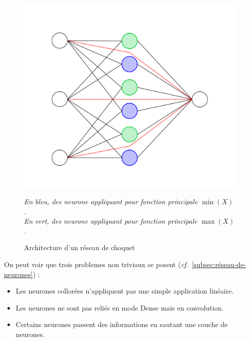 \begin{figure}[H]
    \center
    \includegraphics[height=\moyen]{pict/chnet1}
	\caption{Architecture d'un réseau de choquet}
	\label{fig:chnet1}
    \vspace{-10pt}
    \begin{center}
        \tiny
        \textit{
        En bleu, des neurone appliquant pour fonction principale $\min(X)$. \\
        En vert, des neurone appliquant pour fonction principale $\max(X)$.
        }
    \end{center}
\end{figure}
\vspace{-12pt}
On peut voir que trois problemes non triviaux se posent (\textit{cf.}\ \ref{subsec:réseau-de-neurones}) :
\begin{itemize}
    \item Les neurones collorées n'appliquent pas une simple application linéaire.
    \item Les neurones ne sont pas reliés en mode Dense mais en convolution.
    \item Certains neurones passent des informations en sautant une couche de neurones.
\end{itemize}


